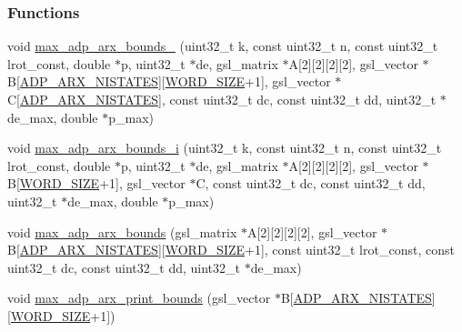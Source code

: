 \subsubsection*{\-Functions}
\begin{DoxyCompactItemize}
\item 
void \hyperlink{max-adp-arx_8cc_aca732635ed09b370e99cb05feb4c2765}{max\-\_\-adp\-\_\-arx\-\_\-bounds\-\_} (uint32\-\_\-t k, const uint32\-\_\-t n, const uint32\-\_\-t lrot\-\_\-const, double $\ast$p, uint32\-\_\-t $\ast$de, gsl\-\_\-matrix $\ast$\-A\mbox{[}2\mbox{]}\mbox{[}2\mbox{]}\mbox{[}2\mbox{]}\mbox{[}2\mbox{]}, gsl\-\_\-vector $\ast$\-B\mbox{[}\hyperlink{adp-arx_8hh_af9236f8d08a54b97ed2199271de979f6}{\-A\-D\-P\-\_\-\-A\-R\-X\-\_\-\-N\-I\-S\-T\-A\-T\-E\-S}\mbox{]}\mbox{[}\hyperlink{common_8hh_a92ed8507d1cd2331ad09275c5c4c1c89}{\-W\-O\-R\-D\-\_\-\-S\-I\-Z\-E}+1\mbox{]}, gsl\-\_\-vector $\ast$\-C\mbox{[}\hyperlink{adp-arx_8hh_af9236f8d08a54b97ed2199271de979f6}{\-A\-D\-P\-\_\-\-A\-R\-X\-\_\-\-N\-I\-S\-T\-A\-T\-E\-S}\mbox{]}, const uint32\-\_\-t dc, const uint32\-\_\-t dd, uint32\-\_\-t $\ast$de\-\_\-max, double $\ast$p\-\_\-max)
\item 
void \hyperlink{max-adp-arx_8cc_a0976a49270edcbdfae7c207c0b807a89}{max\-\_\-adp\-\_\-arx\-\_\-bounds\-\_\-i} (uint32\-\_\-t k, const uint32\-\_\-t n, const uint32\-\_\-t lrot\-\_\-const, double $\ast$p, uint32\-\_\-t $\ast$de, gsl\-\_\-matrix $\ast$\-A\mbox{[}2\mbox{]}\mbox{[}2\mbox{]}\mbox{[}2\mbox{]}\mbox{[}2\mbox{]}, gsl\-\_\-vector $\ast$\-B\mbox{[}\hyperlink{common_8hh_a92ed8507d1cd2331ad09275c5c4c1c89}{\-W\-O\-R\-D\-\_\-\-S\-I\-Z\-E}+1\mbox{]}, gsl\-\_\-vector $\ast$\-C, const uint32\-\_\-t dc, const uint32\-\_\-t dd, uint32\-\_\-t $\ast$de\-\_\-max, double $\ast$p\-\_\-max)
\item 
void \hyperlink{max-adp-arx_8cc_a33419708a7aa0ca45657294dcfd98d86}{max\-\_\-adp\-\_\-arx\-\_\-bounds} (gsl\-\_\-matrix $\ast$\-A\mbox{[}2\mbox{]}\mbox{[}2\mbox{]}\mbox{[}2\mbox{]}\mbox{[}2\mbox{]}, gsl\-\_\-vector $\ast$\-B\mbox{[}\hyperlink{adp-arx_8hh_af9236f8d08a54b97ed2199271de979f6}{\-A\-D\-P\-\_\-\-A\-R\-X\-\_\-\-N\-I\-S\-T\-A\-T\-E\-S}\mbox{]}\mbox{[}\hyperlink{common_8hh_a92ed8507d1cd2331ad09275c5c4c1c89}{\-W\-O\-R\-D\-\_\-\-S\-I\-Z\-E}+1\mbox{]}, const uint32\-\_\-t lrot\-\_\-const, const uint32\-\_\-t dc, const uint32\-\_\-t dd, uint32\-\_\-t $\ast$de\-\_\-max)
\item 
void \hyperlink{max-adp-arx_8cc_ae6cb4039d510247582c4e275a7efc3d1}{max\-\_\-adp\-\_\-arx\-\_\-print\-\_\-bounds} (gsl\-\_\-vector $\ast$\-B\mbox{[}\hyperlink{adp-arx_8hh_af9236f8d08a54b97ed2199271de979f6}{\-A\-D\-P\-\_\-\-A\-R\-X\-\_\-\-N\-I\-S\-T\-A\-T\-E\-S}\mbox{]}\mbox{[}\hyperlink{common_8hh_a92ed8507d1cd2331ad09275c5c4c1c89}{\-W\-O\-R\-D\-\_\-\-S\-I\-Z\-E}+1\mbox{]})

\end{DoxyCompactItemize}
